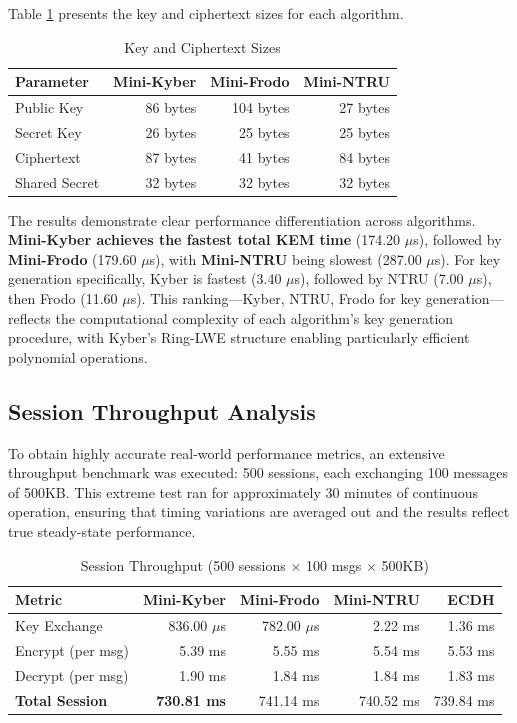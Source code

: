\documentclass[11pt,a4paper]{article}
\begin{document}
Table \ref{tab:sizes} presents the key and ciphertext sizes for each algorithm.

\begin{table}[H]
\centering
\caption{Key and Ciphertext Sizes}
\label{tab:sizes}
\begin{tabular}{l|r|r|r}
\toprule
\textbf{Parameter} & \textbf{Mini-Kyber} & \textbf{Mini-Frodo} & \textbf{Mini-NTRU} \\
\midrule
Public Key & 86 bytes & 104 bytes & 27 bytes \\
Secret Key & 26 bytes & 25 bytes & 25 bytes \\
Ciphertext & 87 bytes & 41 bytes & 84 bytes \\
Shared Secret & 32 bytes & 32 bytes & 32 bytes \\
\bottomrule
\end{tabular}
\end{table}

The results demonstrate clear performance differentiation across algorithms. \textbf{Mini-Kyber achieves the fastest total KEM time} (174.20 $\mu$s), followed by \textbf{Mini-Frodo} (179.60 $\mu$s), with \textbf{Mini-NTRU} being slowest (287.00 $\mu$s). For key generation specifically, Kyber is fastest (3.40 $\mu$s), followed by NTRU (7.00 $\mu$s), then Frodo (11.60 $\mu$s). This ranking---Kyber, NTRU, Frodo for key generation---reflects the computational complexity of each algorithm's key generation procedure, with Kyber's Ring-LWE structure enabling particularly efficient polynomial operations.

\subsection{Session Throughput Analysis}

To obtain highly accurate real-world performance metrics, an extensive throughput benchmark was executed: 500 sessions, each exchanging 100 messages of 500KB. This extreme test ran for approximately 30 minutes of continuous operation, ensuring that timing variations are averaged out and the results reflect true steady-state performance.

\begin{table}[H]
\centering
\caption{Session Throughput (500 sessions $\times$ 100 msgs $\times$ 500KB)}
\label{tab:throughput}
\begin{tabular}{l|r|r|r|r}
\toprule
\textbf{Metric} & \textbf{Mini-Kyber} & \textbf{Mini-Frodo} & \textbf{Mini-NTRU} & \textbf{ECDH} \\
\midrule
Key Exchange & 836.00 $\mu$s & 782.00 $\mu$s & 2.22 ms & 1.36 ms \\
Encrypt (per msg) & 5.39 ms & 5.55 ms & 5.54 ms & 5.53 ms \\
Decrypt (per msg) & 1.90 ms & 1.84 ms & 1.84 ms & 1.83 ms \\
\midrule
\textbf{Total Session} & \textbf{730.81 ms} & 741.14 ms & 740.52 ms & 739.84 ms \\
\bottomrule
\end{tabular}
\end{table}
\end{document}
